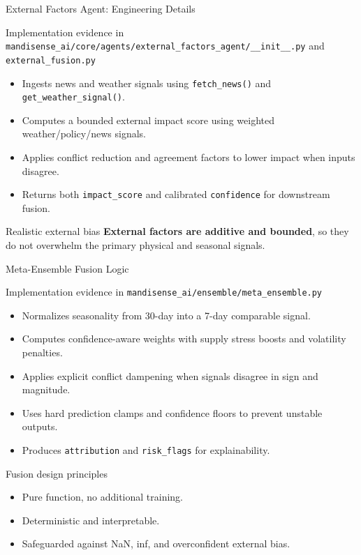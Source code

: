\documentclass{beamer}
\begin{document}
\begin{frame}{External Factors Agent: Engineering Details}
\begin{infocard}{Implementation evidence in \texttt{mandisense\_ai/core/agents/external\_factors\_agent/\_\_init\_\_.py} and \texttt{external\_fusion.py}}
  \begin{itemize}
    \item Ingests news and weather signals using \texttt{fetch\_news()} and \texttt{get\_weather\_signal()}.
    \item Computes a bounded external impact score using weighted weather/policy/news signals.
    \item Applies conflict reduction and agreement factors to lower impact when inputs disagree.
    \item Returns both \texttt{impact\_score} and calibrated \texttt{confidence} for downstream fusion.
  \end{itemize}
\end{infocard}

\begin{successcard}{Realistic external bias}
  \textbf{External factors are additive and bounded}, so they do not overwhelm the primary physical and seasonal signals.
\end{successcard}
\end{frame}

\begin{frame}{Meta-Ensemble Fusion Logic}
\begin{infocard}{Implementation evidence in \texttt{mandisense\_ai/ensemble/meta\_ensemble.py}}
  \begin{itemize}
    \item Normalizes seasonality from 30-day into a 7-day comparable signal.
    \item Computes confidence-aware weights with supply stress boosts and volatility penalties.
    \item Applies explicit conflict dampening when signals disagree in sign and magnitude.
    \item Uses hard prediction clamps and confidence floors to prevent unstable outputs.
    \item Produces \texttt{attribution} and \texttt{risk\_flags} for explainability.
  \end{itemize}
\end{infocard}

\begin{block}{Fusion design principles}
  \begin{itemize}
    \item Pure function, no additional training.
    \item Deterministic and interpretable.
    \item Safeguarded against NaN, inf, and overconfident external bias.
  \end{itemize}
\end{block}
\end{frame}
\end{document}
